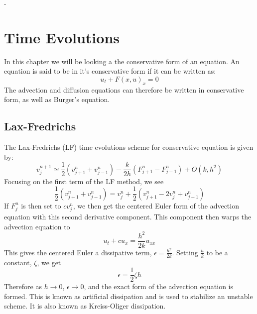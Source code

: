 -\chapter{Time Evolutions}
In this chapter we will be looking a the conservative form of an equation. An equation is said to be in it's conservative form if it can be written as:
\begin{equation} \label{eq:conf}
  u_t + F(x,u)_x = 0
\end{equation}
The advection and diffusion equations can therefore be written in conservative form, as well as Burger's equation.
\section{Lax-Fredrichs}
The Lax-Fredrichs (LF) time evolutions scheme for conservative equation is given by:
\begin{equation*}
  v^{n+1}_j \simeq \frac{1}{2}(v^n_{j+1} + v^n_{j-1}) - \frac{k}{2h}(F^n_{j+1}-F^n_{j-1}) + O(k,h^2)
\end{equation*}
Focusing on the first term of the LF method, we see 
\begin{equation*}
  \frac{1}{2}(v^n_{j+1} + v^n_{j-1}) = v^n_j + \frac{1}{2}(v^n_{j+1} - 2v^n_j + v^n_{j-1})
\end{equation*}
If $F^n_j$ is then set to $cv^n_j$, we then get the centered Euler form of the advection equation with this second derivative component. This component then warps the advection equation to 
\begin{equation*}
 u_t + cu_x = \frac{h^2}{2k}u_{xx}
\end{equation*}
This gives the centered Euler a dissipative term, $\epsilon = \frac{h^2}{2k}$. Setting $\frac{h}{k}$ to be a constant, $\zeta$, we get
\begin{equation*}
  \epsilon = \frac{1}{2}\zeta h
\end{equation*}
Therefore as $h\rightarrow 0$, $\epsilon\rightarrow0$, and the exact form of the advection equation is formed. This is known as artificial dissipation and is used to stabilize an unstable scheme. It is also known as Kreiss-Oliger dissipation.
